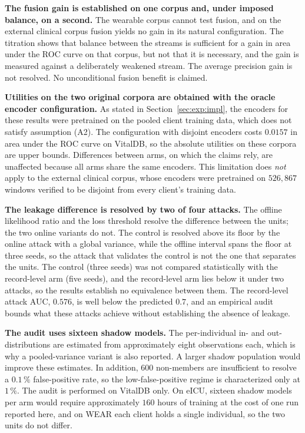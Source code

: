 \textbf{The fusion gain is established on one corpus and, under imposed
balance, on a second.} The wearable corpus cannot test fusion, and on the
external clinical corpus fusion yields no gain in its natural configuration.
The titration shows that balance between the streams is sufficient for a gain
in area under the ROC curve on that corpus, but not that it is necessary, and
the gain is measured against a deliberately weakened stream. The average
precision gain is not resolved. No unconditional fusion benefit is claimed.

\textbf{Utilities on the two original corpora are obtained with the oracle
encoder configuration.} As stated in Section~\ref{sec:exp:impl}, the encoders
for these results were pretrained on the pooled client training data, which
does not satisfy assumption (A2). The configuration with disjoint encoders
costs $0.0157$ in area under the ROC curve on VitalDB, so the absolute
utilities on these corpora are upper bounds. Differences between arms, on which the claims rely,
are unaffected because all arms share the same encoders. This limitation does
\emph{not} apply to the external clinical corpus, whose encoders were
pretrained on $526{,}867$ windows verified to be disjoint from every client's
training data.

\textbf{The leakage difference is resolved by two of four attacks.} The
offline likelihood ratio and the loss threshold resolve the difference between
the units; the two online variants do not. The control is resolved above its
floor by the online attack with a global variance, while the offline interval
spans the floor at three seeds, so the attack that validates the control is
not the one that separates the units. The control (three seeds) was not
compared statistically with the record-level arm (five seeds), and the
record-level arm lies below it under two attacks, so the results establish no
equivalence between them. The record-level attack AUC, $0.576$, is well below
the predicted $0.7$, and an empirical audit bounds what these attacks achieve
without establishing the absence of leakage.

\textbf{The audit uses sixteen shadow models.} The per-individual in- and
out-distributions are estimated from approximately eight observations each,
which is why a pooled-variance variant is also reported. A larger shadow
population would improve these estimates. In addition, $600$ non-members are
insufficient to resolve a $0.1\,\%$ false-positive rate, so the
low-false-positive regime is characterized only at $1\,\%$. The audit is
performed on VitalDB only. On eICU, sixteen shadow models per arm would require
approximately $160$ hours of training at the cost of one run reported here, and
on WEAR each client holds a single individual, so the two units do not differ.

